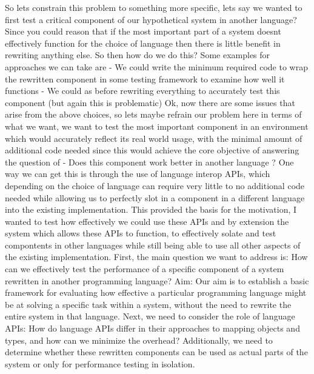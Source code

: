 {}So lets constrain this problem to something more specific, lets say we wanted to first test a critical component of our hypothetical system in another language? Since you could reason that if the most important part of a system doesnt effectively function for the choice of language then there is little benefit in rewriting anything else. So then how do we do this? Some examples for approaches we can take are - We could write the minimum required code to wrap the rewritten component in some testing framework to examine how well it functions - We could as before rewriting everything to accurately test this component (but again this is problematic)\markdownRendererInterblockSeparator
{}Ok, now there are some issues that arise from the above choices, so lets maybe refrain our problem here in terms of what we want, we want to test the most important component in an environment which would accurately reflect its real world usage, with the minimal amount of additional code needed since this would achieve the core objective of answering the question of - Does this component work better in another language ? \markdownRendererInterblockSeparator
{}One way we can get this is through the use of language interop APIs, which depending on the choice of language can require very little to no additional code needed while allowing us to perfectly slot in a component in a different language into the existing implementation.\markdownRendererInterblockSeparator
{}This provided the basis for the motivation, I wanted to test how effectively we could use these APIs and by extension the system which allows these APIs to function, to effectively solate and test compontents in other languages while still being able to use all other aspects of the existing implementation.\markdownRendererInterblockSeparator
{}\markdownRendererInterblockSeparator
{}First, the main question we want to address is:\markdownRendererInterblockSeparator
{}How can we effectively test the performance of a specific component of a system rewritten in another programming language?\markdownRendererInterblockSeparator
{}Aim: Our aim is to establish a basic framework for evaluating how effective a particular programming language might be at solving a specific task within a system, without the need to rewrite the entire system in that language.\markdownRendererInterblockSeparator
{}Next, we need to consider the role of language APIs:\markdownRendererInterblockSeparator
{}How do language APIs differ in their approaches to mapping objects and types, and how can we minimize the overhead? Additionally, we need to determine whether these rewritten components can be used as actual parts of the system or only for performance testing in isolation.\markdownRendererInterblockSeparator
